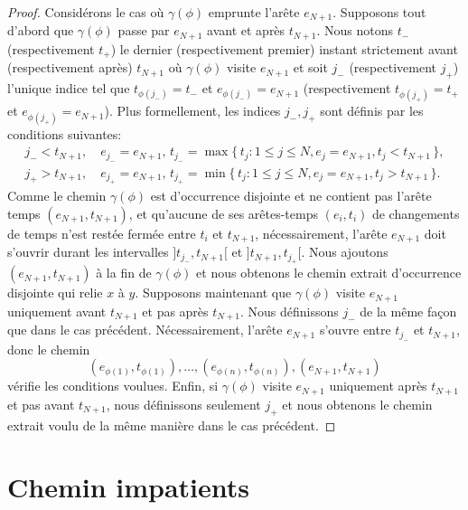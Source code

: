 \documentclass[titlepage,a4paper,12pt]{article}
\newcounter{d}
\newcounter{t}
\newcounter{p}
\newcounter{c}
\newcounter{a}
\newcounter{l}
\begin{document}
\begin{proof}
Considérons le cas où $\gamma(\phi)$ emprunte l'arête $e_{N+1}$. Supposons tout d'abord que $\gamma(\phi)$ passe par $e_{N+1}$ avant et après $t_{N+1}$. Nous notons $t_-$ (respectivement $t_+$) le dernier (respectivement premier) instant strictement avant (respectivement après) $t_{N+1}$ où $\gamma(\phi)$ visite $e_{N+1}$ et soit $j_-$ (respectivement $j_+$) l'unique indice tel que $t_{\phi(j_-)}= t_-$ et $e_{\phi(j_-)}= e_{N+1}$ (respectivement $t_{\phi(j_+)}= t_+$ et $e_{\phi(j_+)}= e_{N+1}$). Plus formellement, les indices $j_-,j_+$ sont définis par les conditions suivantes:
\begin{align*}
{j_-}< t_{N+1},\quad e_{j_-} = e_{N+1},\, t_{j_-} = \max \big\{\,t_j:1\leqslant j \leqslant N, e_j = e_{N+1}, t_j < t_{N+1}\,\big\},\\
{j_+}> t_{N+1},\quad e_{j_+} = e_{N+1},\, t_{j_+} = \min \big\{\,t_j:1\leqslant j \leqslant N, e_j = e_{N+1}, t_j > t_{N+1}\,\big\}.
\end{align*}
Comme le chemin $\gamma(\phi)$ est d'occurrence disjointe et ne contient pas l'arête temps $(e_{N+1},t_{N+1})$, et qu'aucune de ses arêtes-temps $(e_i,t_i)$ de changements de temps n'est restée fermée entre $t_i$ et $t_{N+1}$, nécessairement, l'arête $e_{N+1}$ doit s'ouvrir durant les intervalles $]t_{j_-},t_{N+1}[$ et $]t_{N+1},t_{j_+}[$. Nous ajoutons $(e_{N+1},t_{N+1})$ à la fin de $\gamma(\phi)$ et nous obtenons le chemin extrait d'occurrence disjointe qui relie $x$ à $y$. Supposons maintenant que $\gamma(\phi)$ visite $e_{N+1}$ uniquement avant $t_{N+1}$ et pas après $t_{N+1}$. Nous définissons $j_-$ de la même façon que dans le cas précédent. Nécessairement, l'arête $e_{N+1}$ s'ouvre entre $t_{j_-}$ et $t_{N+1}$, donc le chemin $$(e_{\phi(1)},t_{\phi(1)}),\dots, (e_{\phi(n)},t_{\phi(n)}),(e_{N+1},t_{N+1})$$ vérifie les conditions voulues. Enfin, si $\gamma(\phi)$ visite $e_{N+1}$ uniquement après $t_{N+1}$ et pas avant $t_{N+1}$, nous définissons seulement $j_+$ et nous obtenons le chemin extrait voulu de la même manière dans le cas précédent.
\end{proof}

\section{Chemin impatients}
\end{document}
